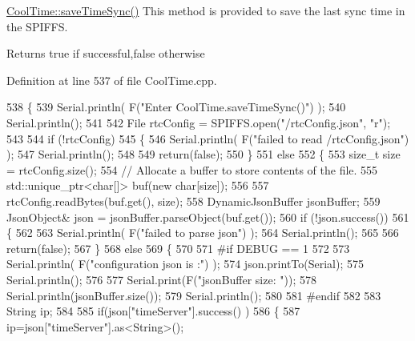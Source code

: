 \hyperlink{class_cool_time_ae9658c9b377510d469e3b88edf33ee85}{Cool\+Time\+::save\+Time\+Sync()} This method is provided to save the last sync time in the S\+P\+I\+F\+FS.

\begin{DoxyReturn}{Returns}
true if successful,false otherwise 
\end{DoxyReturn}


Definition at line 537 of file Cool\+Time.\+cpp.


\begin{DoxyCode}
538 \{
539     Serial.println( F(\textcolor{stringliteral}{"Enter CoolTime.saveTimeSync()"}) );
540     Serial.println();
541 
542     File rtcConfig = SPIFFS.open(\textcolor{stringliteral}{"/rtcConfig.json"}, \textcolor{stringliteral}{"r"});
543 
544     \textcolor{keywordflow}{if} (!rtcConfig) 
545     \{
546         Serial.println( F(\textcolor{stringliteral}{"failed to read /rtcConfig.json"}) );
547         Serial.println();
548 
549         \textcolor{keywordflow}{return}(\textcolor{keyword}{false});
550     \}
551     \textcolor{keywordflow}{else}
552     \{
553         \textcolor{keywordtype}{size\_t} size = rtcConfig.size();
554         \textcolor{comment}{// Allocate a buffer to store contents of the file.}
555         std::unique\_ptr<char[]> buf(\textcolor{keyword}{new} \textcolor{keywordtype}{char}[size]);
556 
557         rtcConfig.readBytes(buf.get(), size);
558         DynamicJsonBuffer jsonBuffer;
559         JsonObject& json = jsonBuffer.parseObject(buf.get());
560         \textcolor{keywordflow}{if} (!json.success()) 
561         \{
562 
563             Serial.println( F(\textcolor{stringliteral}{"failed to parse json"}) );
564             Serial.println();
565 
566             \textcolor{keywordflow}{return}(\textcolor{keyword}{false});
567         \} 
568         \textcolor{keywordflow}{else}
569         \{
570 
571 \textcolor{preprocessor}{        #if DEBUG == 1}
572     
573             Serial.println( F(\textcolor{stringliteral}{"configuration json is :"}) );
574             json.printTo(Serial);
575             Serial.println();
576 
577             Serial.print(F(\textcolor{stringliteral}{"jsonBuffer size: "}));
578             Serial.println(jsonBuffer.size());
579             Serial.println();
580 
581 \textcolor{preprocessor}{        #endif}
582 
583             String ip;
584                     
585             \textcolor{keywordflow}{if}(json[\textcolor{stringliteral}{"timeServer"}].success() )
586             \{           
587                  ip=json[\textcolor{stringliteral}{"timeServer"}].as<String>();

\end{DoxyCode}
